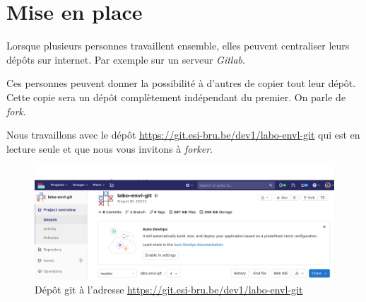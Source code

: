 \documentclass[a4paper,11pt]{style-esi/td}
\begin{document}
\section{Mise en place}

Lorsque plusieurs personnes travaillent ensemble, elles peuvent centraliser
leurs dépôts sur internet. Par exemple sur un serveur \textit{Gitlab}. 

Ces personnes peuvent donner la possibilité à d'autres de copier tout leur
dépôt. Cette copie sera un dépôt complètement indépendant du premier. On parle
de \textit{fork}.  

\bigskip
\begin{colxbox}[colback=white,drop fuzzy shadow]

	Nous travaillons avec le dépôt
	\url{https://git.esi-bru.be/dev1/labo-envl-git} 
	qui est en lecture seule et
	que nous vous invitons à \textit{forker}.

\end{colxbox}
\bigskip

\begin{figure}[h]
	\centering
	\includegraphics[width=.9\linewidth]{img/depot-git-1.png}
	\caption{Dépôt git à l'adresse \url{https://git.esi-bru.be/dev1/labo-envl-git}}
	\label{fig:depot}
\end{figure}
\end{document}
